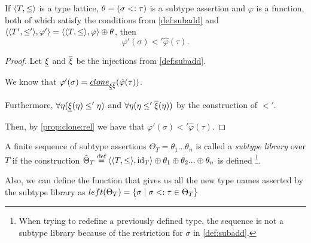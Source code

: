 \documentclass[main.tex]{subfiles}
\begin{document}
\begin{lemma}
    \label{lemma:subadd:phi}
    If $\langle  T,  \leq  \rangle$ is a type lattice, $\theta = (\sigma <: \tau)$
    is a subtype assertion and $\varphi$ is a function, both of which satisfy the conditions from \cref{def:subadd}
    and $\langle \langle  T',  \leq'  \rangle, \varphi' \rangle
    = \langle \langle  T,  \leq  \rangle, \varphi \rangle \oplus \theta$, then
    \[ \varphi'(\sigma) \less' \hat{\varphi}(\tau). \]
\end{lemma}
\begin{proof}
    Let $\underline{\xi}$ and $\overline{\xi}$ be the injections from \cref{def:subadd}.

    We know that $\varphi'(\sigma) = \underline{clone}_{\underline{\xi} \overline{\xi}}(\hat{\varphi}(\tau))$.

    Furthermore,
    $\forall \eta (\underline{\xi}(\eta) \leq' \eta)$ and
    $\forall \eta (\eta \leq' \overline{\xi}(\eta))$ by the construction of
    $\less'$.

    Then, by \cref{prop:clone:rel} we have that $\varphi'(\sigma) \less'
    \hat{\varphi}(\tau)$.
\end{proof}

\begin{defn}
    A finite sequence of subtype assertions
    $\Theta_T = \theta_1 ... \theta_n$ is called a \emph{subtype library} over $T$
    if the construction $\hat{\Theta}_T \overset{\text{\scriptsize def}}{=} \langle \langle  T,  \leq  \rangle, \mathrm{id}_T \rangle \oplus \theta_1 \oplus \theta_2 ... \oplus \theta_n$
    is defined \footnote{
        When trying to redefine a previously defined type, the sequence is not
        a subtype library because of the restriction for $\sigma$
        in \cref{def:subadd}.
    }.

    Also, we can define the function that gives us all the new type names
    asserted by the subtype library as
    $left(\Theta_T) = \{ \sigma \mid \sigma <: \tau \in \Theta_T \}$
\end{defn}
\end{document}
